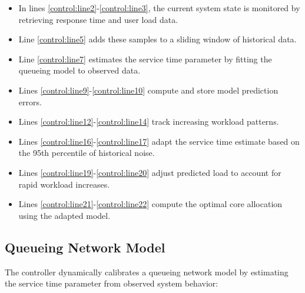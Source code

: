 \begin{itemize}
    \item In lines \ref{control:line2}-\ref{control:line3}, the current system state is monitored by retrieving response time and user load data.
    \item Line \ref{control:line5} adds these samples to a sliding window of historical data.
    \item Line \ref{control:line7} estimates the service time parameter by fitting the queueing model to observed data.
    \item Lines \ref{control:line9}-\ref{control:line10} compute and store model prediction errors.
    \item Lines \ref{control:line12}-\ref{control:line14} track increasing workload patterns.
    \item Lines \ref{control:line16}-\ref{control:line17} adapt the service time estimate based on the 95th percentile of historical noise.
    \item Lines \ref{control:line19}-\ref{control:line20} adjust predicted load to account for rapid workload increases.
    \item Lines \ref{control:line21}-\ref{control:line22} compute the optimal core allocation using the adapted model.
\end{itemize}

\subsection{Queueing Network Model}

The controller dynamically calibrates a queueing network model by estimating the service time parameter from observed system behavior:

